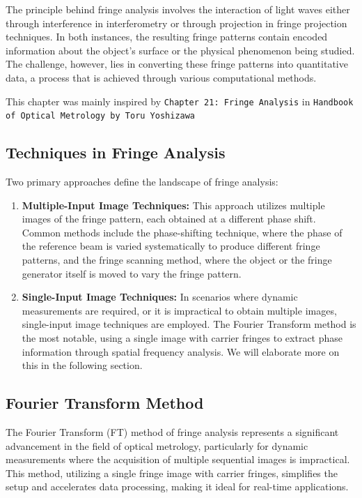 \documentclass[../main.tex]{subfiles}
\begin{document}
The principle behind fringe analysis involves the interaction of light waves either through interference in interferometry or through projection in fringe projection techniques. In both instances, the resulting fringe patterns contain encoded information about the object's surface or the physical phenomenon being studied. The challenge, however, lies in converting these fringe patterns into quantitative data, a process that is achieved through various computational methods.

This chapter was mainly inspired by \texttt{Chapter 21: Fringe Analysis} in \texttt{Handbook of Optical Metrology by Toru Yoshizawa}\cite{fringe_analysis}
\vspace{-15pt}
\subsection{Techniques in Fringe Analysis}
\vspace{-8pt}
Two primary approaches define the landscape of fringe analysis:
\vspace{-4pt}
\begin{enumerate}
    \setlength{\itemsep}{0.1mm}
    \item \textbf{Multiple-Input Image Techniques:} This approach utilizes multiple images of the fringe pattern, each obtained at a different phase shift. Common methods include the phase-shifting technique, where the phase of the reference beam is varied systematically to produce different fringe patterns, and the fringe scanning method, where the object or the fringe generator itself is moved to vary the fringe pattern.
    \item \textbf{Single-Input Image Techniques:} In scenarios where dynamic measurements are required, or it is impractical to obtain multiple images, single-input image techniques are employed. The Fourier Transform method is the most notable, using a single image with carrier fringes to extract phase information through spatial frequency analysis. We will elaborate more on this in the following section.
\end{enumerate}

\subsection{Fourier Transform Method}
\vspace{-8pt}
The Fourier Transform (FT) method of fringe analysis represents a significant advancement in the field of optical metrology, particularly for dynamic measurements where the acquisition of multiple sequential images is impractical. This method, utilizing a single fringe image with carrier fringes, simplifies the setup and accelerates data processing, making it ideal for real-time applications.
\vspace{-8pt}
\end{document}
